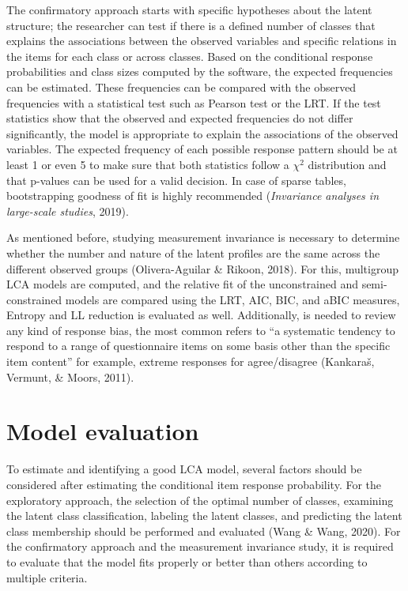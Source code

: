 \documentclass[12pt,a4paper,oneside]{reedthesis}
\begin{document}
The confirmatory approach starts with specific hypotheses about the latent structure; the researcher can test if there is a defined number of classes that explains the associations between the observed variables and specific relations in the items for each class or across classes. Based on the conditional response probabilities and class sizes computed by the software, the expected frequencies can be estimated. These frequencies can be compared with the observed frequencies with a statistical test such as Pearson test or the LRT. If the test statistics show that the observed and expected frequencies do not differ significantly, the model is appropriate to explain the associations of the observed variables. The expected frequency of each possible response pattern should be at least 1 or even 5 to make sure that both statistics follow a \(\chi^2\) distribution and that p-values can be used for a valid decision. In case of sparse tables, bootstrapping goodness of fit is highly recommended (\emph{Invariance analyses in large-scale studies}, 2019).

As mentioned before, studying measurement invariance is necessary to determine whether the number and nature of the latent profiles are the same across the different observed groups (Olivera-Aguilar \& Rikoon, 2018). For this, multigroup LCA models are computed, and the relative fit of the unconstrained and semi-constrained models are compared using the LRT, AIC, BIC, and aBIC measures, Entropy and LL reduction is evaluated as well. Additionally, is needed to review any kind of response bias, the most common refers to ``a systematic tendency to respond to a range of questionnaire items on some basis other than the specific item content'' for example, extreme responses for agree/disagree (Kankaraš, Vermunt, \& Moors, 2011).

\hypertarget{model-evaluation}{%
\section{Model evaluation}\label{model-evaluation}}

To estimate and identifying a good LCA model, several factors should be considered after estimating the conditional item response probability. For the exploratory approach, the selection of the optimal number of classes, examining the latent class classification, labeling the latent classes, and predicting the latent class membership should be performed and evaluated (Wang \& Wang, 2020). For the confirmatory approach and the measurement invariance study, it is required to evaluate that the model fits properly or better than others according to multiple criteria.
\end{document}
